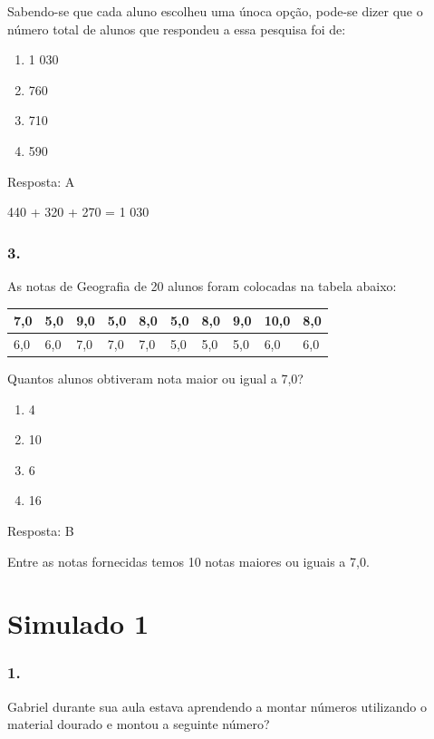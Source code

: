 Sabendo-se que cada aluno escolheu uma únoca opção, pode-se dizer que o
número total de alunos que respondeu a essa pesquisa foi de:

\begin{enumerate}
\def\labelenumi{\alph{enumi})}
\item
  1 030
\item
  760
\item
  710
\item
  590
\end{enumerate}

Resposta: A

440 + 320 + 270 = 1 030

\subsubsection{3.}\label{section-125}

As notas de Geografia de 20 alunos foram colocadas na tabela abaixo:

\begin{longtable}[]{@{}llllllllll@{}}
\toprule
7,0 & 5,0 & 9,0 & 5,0 & 8,0 & 5,0 & 8,0 & 9,0 & 10,0 &
8,0\tabularnewline
\midrule
\endhead
6,0 & 6,0 & 7,0 & 7,0 & 7,0 & 5,0 & 5,0 & 5,0 & 6,0 & 6,0\tabularnewline
\bottomrule
\end{longtable}

Quantos alunos obtiveram nota maior ou igual a 7,0?

\begin{enumerate}
\def\labelenumi{\alph{enumi})}
\item
  4
\item
  10
\item
  6
\item
  16
\end{enumerate}

Resposta: B

Entre as notas fornecidas temos 10 notas maiores ou iguais a 7,0.

\section{Simulado 1}\label{simulado-1}

\subsubsection{1.}\label{section-126}

Gabriel durante sua aula estava aprendendo a montar números utilizando o
material dourado e montou a seguinte número?

